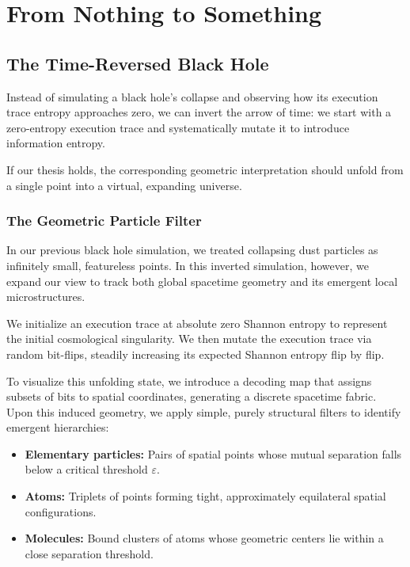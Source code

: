 \chapter{From Nothing to Something}
\label{chap:from-nothing-to-something}

\section{The Time-Reversed Black Hole}

Instead of simulating a black hole's collapse and observing how its execution trace entropy approaches zero, we can invert the arrow of time: 
we start with a zero-entropy execution trace and systematically mutate it to introduce information entropy. 

If our thesis holds, the corresponding geometric interpretation should unfold from a single point into a virtual, expanding universe.

\subsection*{The Geometric Particle Filter}

In our previous black hole simulation, we treated collapsing dust particles as infinitely small, featureless points. In this inverted simulation, however, 
we expand our view to track both global spacetime geometry and its emergent local microstructures.

We initialize an execution trace at absolute zero Shannon entropy to represent the initial cosmological singularity. 
We then mutate the execution trace via random bit-flips, steadily increasing its expected Shannon entropy flip by flip.

To visualize this unfolding state, we introduce a decoding map that assigns subsets of bits to spatial coordinates, generating a discrete spacetime fabric. 
Upon this induced geometry, we apply simple, purely structural filters to identify emergent hierarchies:

\begin{itemize}
    \item \textbf{Elementary particles:} Pairs of spatial points whose mutual separation falls below a critical threshold $\varepsilon$.
    \item \textbf{Atoms:} Triplets of points forming tight, approximately equilateral spatial configurations.
    \item \textbf{Molecules:} Bound clusters of atoms whose geometric centers lie within a close separation threshold.
\end{itemize}

